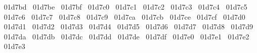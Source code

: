 {  ^^^^^^01d7bd%
  ^^^^^^01d7be%
  ^^^^^^01d7bf%
  ^^^^^^01d7c0%
  ^^^^^^01d7c1%
  ^^^^^^01d7c2%
  ^^^^^^01d7c3%
  ^^^^^^01d7c4%
  ^^^^^^01d7c5%
  ^^^^^^01d7c6%
  ^^^^^^01d7c7%
  ^^^^^^01d7c8%
  ^^^^^^01d7c9%
  ^^^^^^01d7ca%
  ^^^^^^01d7cb%
  ^^^^^^01d7ce%
  ^^^^^^01d7cf%
  ^^^^^^01d7d0%
  ^^^^^^01d7d1%
  ^^^^^^01d7d2%
  ^^^^^^01d7d3%
  ^^^^^^01d7d4%
  ^^^^^^01d7d5%
  ^^^^^^01d7d6%
  ^^^^^^01d7d7%
  ^^^^^^01d7d8%
  ^^^^^^01d7d9%
  ^^^^^^01d7da%
  ^^^^^^01d7db%
  ^^^^^^01d7dc%
  ^^^^^^01d7dd%
  ^^^^^^01d7de%
  ^^^^^^01d7df%
  ^^^^^^01d7e0%
  ^^^^^^01d7e1%
  ^^^^^^01d7e2%
  ^^^^^^01d7e3%
}
